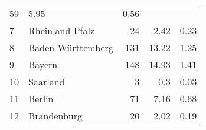 \begin{longtable}{lXrrr}
       \num{59} &
       \num[round-mode=places,round-precision=2]{5,95} &
         \num[round-mode=places,round-precision=2]{0,56} \\

     7 &
     \multicolumn{1}{X}{ Rheinland-Pfalz   } &


       \num{24} &
       \num[round-mode=places,round-precision=2]{2,42} &
         \num[round-mode=places,round-precision=2]{0,23} \\

     8 &
     \multicolumn{1}{X}{ Baden-Württemberg   } &


       \num{131} &
       \num[round-mode=places,round-precision=2]{13,22} &
         \num[round-mode=places,round-precision=2]{1,25} \\

     9 &
     \multicolumn{1}{X}{ Bayern   } &


       \num{148} &
       \num[round-mode=places,round-precision=2]{14,93} &
         \num[round-mode=places,round-precision=2]{1,41} \\

     10 &
     \multicolumn{1}{X}{ Saarland   } &


       \num{3} &
       \num[round-mode=places,round-precision=2]{0,3} &
         \num[round-mode=places,round-precision=2]{0,03} \\

     11 &
     \multicolumn{1}{X}{ Berlin   } &


       \num{71} &
       \num[round-mode=places,round-precision=2]{7,16} &
         \num[round-mode=places,round-precision=2]{0,68} \\

     12 &
     \multicolumn{1}{X}{ Brandenburg   } &


       \num{20} &
       \num[round-mode=places,round-precision=2]{2,02} &
         \num[round-mode=places,round-precision=2]{0,19} \\


\end{longtable}
